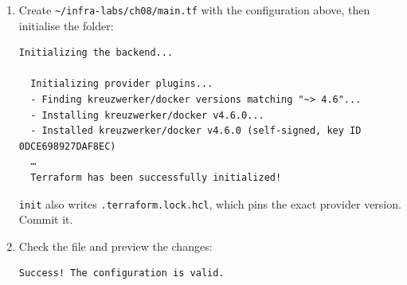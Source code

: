 \begin{enumerate}
\def\labelenumi{\arabic{enumi}.}
\item
  Create \texttt{\textasciitilde{}/}\allowbreak{}\texttt{infra-}\allowbreak{}\texttt{labs/}\allowbreak{}\texttt{ch08/}\allowbreak{}\texttt{main.}\allowbreak{}\texttt{tf} with the configuration above, then initialise the folder:

  \begin{codeblock}

\begin{Shaded}
\begin{Highlighting}[]
\end{Highlighting}
\end{Shaded}

  \end{codeblock}

  \begin{codeblock}
  \begin{Verbatim}[formatcom=\outputstyle]
  Initializing the backend...

  Initializing provider plugins...
  - Finding kreuzwerker/docker versions matching "~> 4.6"...
  - Installing kreuzwerker/docker v4.6.0...
  - Installed kreuzwerker/docker v4.6.0 (self-signed, key ID 0DCE698927DAF8EC)
  …
  Terraform has been successfully initialized!
  \end{Verbatim}
  \end{codeblock}

  \texttt{init} also writes \texttt{.terraform.lock.hcl}, which pins the exact provider version. Commit it.
\item
  Check the file and preview the changes:

  \begin{codeblock}

\begin{Shaded}
\begin{Highlighting}[]
\end{Highlighting}
\end{Shaded}

  \end{codeblock}

  \begin{codeblock}
  \begin{Verbatim}[formatcom=\outputstyle]
  Success! The configuration is valid.


\end{Verbatim}
\end{codeblock}
\end{enumerate}
